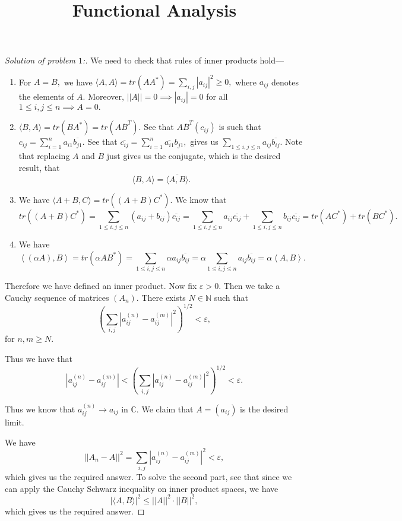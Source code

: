 \documentclass[letterpaper,11pt,twoside]{article}
\title{Functional Analysis}
\theoremstyle{proposition}
\theoremstyle{definition}
\theoremstyle{theorem}
\theoremstyle{definition}
\theoremstyle{definition}
\theoremstyle{definition}
\theoremstyle{lemma}
\theoremstyle{definition}
\theoremstyle{definition}
\theoremstyle{corollary}
\theoremstyle{definition}
\theoremstyle{definition}
\theoremstyle{definition}
\newcommand{\N}{\mathbb{N}}
\newcommand{\C}{\mathbb{C}}
\newcommand{\abs}[1]{\left \vert #1 \right \vert}
\newcommand{\norm}[1]{\left \vert \left \vert #1 \right \vert \right \vert}
\newcommand{\gen}[1]{\left\langle #1\right\rangle}
\begin{document}
	\maketitle
\begin{proof}[Solution of problem $1$:]
We need to check that rules of inner products hold--- 
\begin{enumerate}
	\item For $A=B,$ we have $\langle A,A\rangle=tr(AA^*)= \sum_{i,j}|a_{ij}|^2 \geq 0,$ where $a_{ij}$ denotes the elements of $A.$ 
	Moreover, $||A|| =0 \implies |a_{ij}| =0 $ for all $1 \leq i,j \leq n \implies A=0.$ 
	\item $\langle B,A \rangle = tr(BA^*)= tr(A\overline{B}^T).$ See that $A\overline{B}^T (c_{ij})$ is such that 
	$c_{ij}= \sum_{i=1}^n a_{i1}\overline{b_{j1}}.$ See that $\overline{c_{ij}}=\sum_{i=1}^n \overline{a_{i1} } b_{j1},$ gives us $ \sum_{1 \leq i,j \leq n} 
	a_{ij}\overline{b_{ij}}.$ Note that replacing $A$ and $B$ just gives us the conjugate, which is the desired result, that $$\langle B,A \rangle = 
	\overline{\langle A,B  \rangle}. $$
	\item We have $\langle A+B,C\rangle= tr((A+B)C^*).$ We know that $$tr((A+B)C^*)= \sum_{1 \leq i,j \leq n} (a_{ij}+b_{ij}) \overline{c_{ij}}=\sum_{1 \leq 
		i,j \leq n} a_{ij}\overline{c_{ij}} +\sum_{1 \leq i,j \leq n} b_{ij} \overline{c_{ij}}= tr(AC^*) + tr(BC^*).$$ 
	\item We have $$\gen{(\alpha A),B}= tr(\alpha AB^*)=\sum_{1 \leq i,j \leq n} \alpha a_{ij} \overline{b_{ij}} = \alpha \sum_{1 \leq i,j \leq n} a_{ij} 
	\overline{b_{ij}}= \alpha \gen{A,B}.$$
\end{enumerate}
Therefore we have defined an inner product. 
Now fix $\varepsilon >0.$ Then we take a Cauchy sequence of matrices $(A_n).$ There exists $N \in \N$ such that 
$$ \left(\sum_{i,j}\abs{a^{(n)}_{ij}-a^{(m)}_{ij}}^2\right)^{1/2} < \varepsilon,$$ for $n,m \geq N.$

Thus we have that $$\abs{a^{(n)}_{ij}-a^{(m)}_{ij}} < \left(\sum_{i,j}\abs{a^{(n)}_{ij}-a^{(m)}_{ij}}^2\right)^{1/2} < \varepsilon. $$

Thus we know that $a^{(n)}_{ij} \to a_{ij} $ in $\C.$ We claim that $A=(a_{ij})$ is the desired limit. 

We have $$\norm{A_n-A}^2 = \sum_{i,j} \abs{a^{(n)}_{ij}-a^{(m)}_{ij}}^2 < \varepsilon,$$ which gives us the required answer.
To solve the second part, see that since we can apply the Cauchy Schwarz inequality on inner product spaces, we have $$|\langle A,B\rangle|^2 \leq ||A||^2 
\cdot ||B||^2,$$ which gives us the required answer.
\end{proof}
\end{document}
